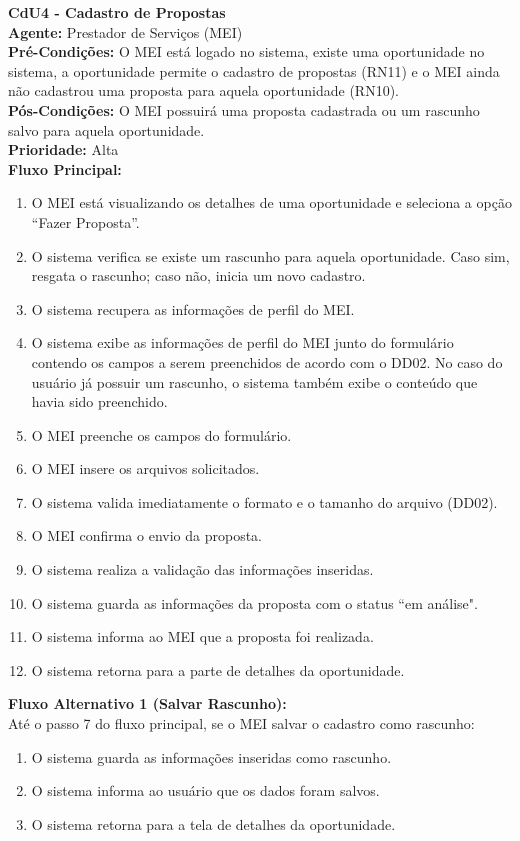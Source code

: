 \vspace{7pt}
\noindent\textbf{\normalsize CdU4 - Cadastro de Propostas}\\
\noindent\textbf{Agente:} Prestador de Serviços (MEI)\\ 
\textbf{Pré-Condições:} O MEI está logado no sistema, existe uma oportunidade no sistema, a oportunidade permite o cadastro de propostas (RN11) e o MEI ainda não cadastrou uma proposta para aquela oportunidade (RN10).\\ 
\textbf{Pós-Condições:} O MEI possuirá uma proposta cadastrada ou um rascunho salvo para aquela oportunidade.\\
\textbf{Prioridade:} Alta \vspace{3pt}\\
\noindent\textbf{Fluxo Principal:} 
\begin{enumerate}[noitemsep, topsep=-5pt, parsep=0pt]
    \item O MEI está visualizando os detalhes de uma oportunidade e seleciona a opção “Fazer Proposta”. 
    \item O sistema verifica se existe um rascunho para aquela oportunidade. Caso sim, resgata o rascunho; caso não, inicia um novo cadastro. 
    \item O sistema recupera as informações de perfil do MEI. 
    \item O sistema exibe as informações de perfil do MEI junto do formulário contendo os campos a serem preenchidos de acordo com o DD02. No caso do usuário já possuir um rascunho, o sistema também exibe o conteúdo que havia sido preenchido. 
    \item O MEI preenche os campos do formulário. 
    \item O MEI insere os arquivos solicitados. 
    \item O sistema valida imediatamente o formato e o tamanho do arquivo (DD02). 
    \item O MEI confirma o envio da proposta.
    \item O sistema realiza a validação das informações inseridas. 
    \item O sistema guarda as informações da proposta com o status ``em análise". 
    \item O sistema informa ao MEI que a proposta foi realizada. 
    \item O sistema retorna para a parte de detalhes da oportunidade. 
\end{enumerate}

\noindent\textbf{Fluxo Alternativo 1 (Salvar Rascunho):}\\ 
Até o passo 7 do fluxo principal, se o MEI salvar o cadastro como rascunho: 
\begin{enumerate}[noitemsep, topsep=-5pt, parsep=0pt]
    \item O sistema guarda as informações inseridas como rascunho. 
    \item O sistema informa ao usuário que os dados foram salvos.
    \item O sistema retorna para a tela de detalhes da oportunidade. 
\end{enumerate}

